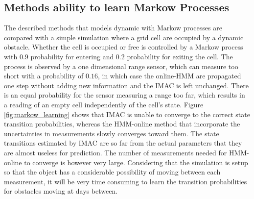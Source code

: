 \subsection{Methods ability to learn Markow Processes}
The described methods that models dynamic with Markow processes are compared with a simple simulation where a grid cell are occupied by a dynamic obstacle. 
Whether the cell is occupied or free is controlled by a Markow process with $0.9$ probability for entering and $0.2$ probability for exiting the cell. 
The process is observed by a one dimensional range sensor, which can measure too short with a probability of $0.16$, in which case the online-HMM are propagated one step without adding new information and the IMAC is left unchanged.
There is an equal probability for the sensor measuring a range too far, which results in a reading of an empty cell independently of the cell's state. 
Figure \ref{fig:markow_learning} shows that IMAC is unable to converge to the correct state transition probabilities, whereas the HMM-online method that incorporate the uncertainties in measurements slowly converges toward them.
The state transitions estimated by IMAC are so far from the actual parameters that they are almost useless for prediction. 
The number of measurements needed for HMM-online to converge is however very large.
Considering that the simulation is setup so that the object has a considerable possibility of moving between each measurement, it will be very time consuming to learn the transition probabilities for obstacles moving at days between.

